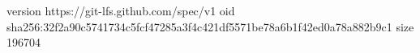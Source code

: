 version https://git-lfs.github.com/spec/v1
oid sha256:32f2a90c5741734c5fcf47285a3f4c421df5571be78a6b1f42ed0a78a882b9c1
size 196704
